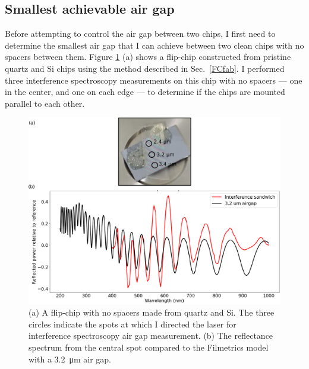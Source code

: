 \documentclass[double,12pt,1in,seploa]{beavtex}
\let\Oldsubsection\subsection
\renewcommand{\subsection}{\FloatBarrier\Oldsubsection}
\begin{document}
\subsection{Smallest achievable air gap} \label{smallest achievable air gap}
Before attempting to control the air gap between two chips, I first need to determine the smallest air gap that I can achieve between two clean chips with no spacers between them. Figure \ref{interference sandwich} (a) shows a flip-chip constructed from pristine quartz and Si chips using the method described in Sec.\ \ref{FCfab}. I performed three interference spectroscopy measurements on this chip with no spacers — one in the center, and one on each edge — to determine if the chips are mounted parallel to each other.


\begin{figure}
    \includegraphics[width=1\textwidth]{interference sandwich image and spectrum.pdf}
    \caption{(a) A flip-chip with no spacers made from quartz and Si. The three circles indicate the spots at which I directed the laser for interference spectroscopy air gap measurement. (b) The reflectance spectrum from the central spot compared to the Filmetrics model with a \SI{3.2}{\micro\meter} air gap.}
    \label{interference sandwich}
\end{figure}
\end{document}
